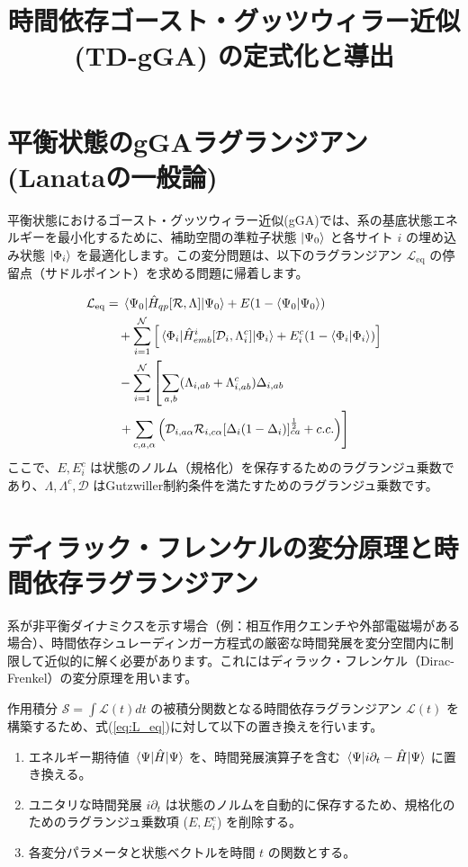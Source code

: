 \documentclass[a4paper,11pt]{ltjarticle}
\title{時間依存ゴースト・グッツウィラー近似 (TD-gGA) の定式化と導出}
\author{}
\date{}
\begin{document}
\maketitle

\section{平衡状態のgGAラグランジアン (Lanataの一般論)}
平衡状態におけるゴースト・グッツウィラー近似(gGA)では、系の基底状態エネルギーを最小化するために、補助空間の準粒子状態 $\ket{\Psi_0}$ と各サイト $i$ の埋め込み状態 $\ket{\Phi_i}$ を最適化します。この変分問題は、以下のラグランジアン $\mathcal{L}_{\text{eq}}$ の停留点（サドルポイント）を求める問題に帰着します。

\begin{align}
\mathcal{L}_{\text{eq}} &= \mel{\Psi_0}{\hat{H}_{qp}[\mathcal{R}, \Lambda]}{\Psi_0} + E(1 - \braket{\Psi_0}{\Psi_0}) \notag \\
&\quad + \sum_{i=1}^{\mathcal{N}} \left[ \mel{\Phi_i}{\hat{H}_{emb}^i[\mathcal{D}_i, \Lambda_i^c]}{\Phi_i} + E_i^c(1 - \braket{\Phi_i}{\Phi_i}) \right] \notag \\
&\quad - \sum_{i=1}^{\mathcal{N}} \left[ \sum_{a,b} (\Lambda_{i,ab} + \Lambda_{i,ab}^c)\Delta_{i,ab} \right. \notag \\
&\quad \left. + \sum_{c,a,\alpha} \left( \mathcal{D}_{i,a\alpha} \mathcal{R}_{i,c\alpha} [\Delta_i(1-\Delta_i)]_{ca}^{\frac{1}{2}} + c.c. \right) \right]
\label{eq:L_eq}
\end{align}
ここで、$E, E_i^c$ は状態のノルム（規格化）を保存するためのラグランジュ乗数であり、$\Lambda, \Lambda^c, \mathcal{D}$ はGutzwiller制約条件を満たすためのラグランジュ乗数です。

\section{ディラック・フレンケルの変分原理と時間依存ラグランジアン}
系が非平衡ダイナミクスを示す場合（例：相互作用クエンチや外部電磁場がある場合）、時間依存シュレーディンガー方程式の厳密な時間発展を変分空間内に制限して近似的に解く必要があります。これにはディラック・フレンケル（Dirac-Frenkel）の変分原理を用います。

作用積分 $\mathcal{S} = \int \mathcal{L}(t) dt$ の被積分関数となる時間依存ラグランジアン $\mathcal{L}(t)$ を構築するため、式(\ref{eq:L_eq})に対して以下の置き換えを行います。
\begin{enumerate}
    \item エネルギー期待値 $\mel{\Psi}{\hat{H}}{\Psi}$ を、時間発展演算子を含む $\mel{\Psi}{i\partial_t - \hat{H}}{\Psi}$ に置き換える。
    \item ユニタリな時間発展 $i\partial_t$ は状態のノルムを自動的に保存するため、規格化のためのラグランジュ乗数項 ($E, E_i^c$) を削除する。
    \item 各変分パラメータと状態ベクトルを時間 $t$ の関数とする。
\end{enumerate}
\end{document}
